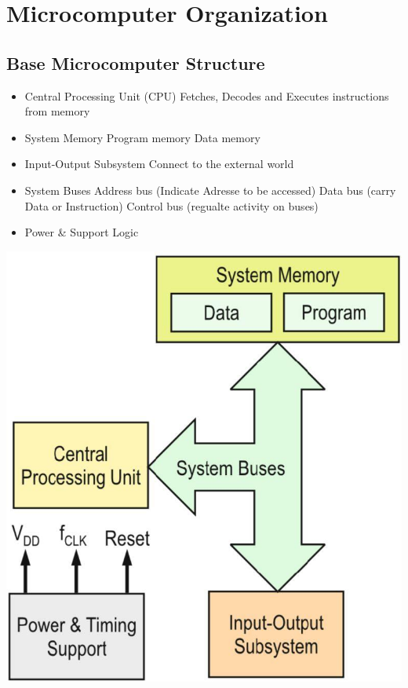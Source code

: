\section{Microcomputer Organization } 
\subsection{Base Microcomputer Structure }
\begin{minipage}{0.7\linewidth}
	\begin{itemize}
		\item Central Processing Unit (\acs{CPU})
		\subitem Fetches, Decodes and Executes instructions from memory
		\item System Memory
		\subitem Program memory
		\subitem Data memory 
		\item Input-Output Subsystem
		\subitem Connect to the external world
		\item System Buses 
		\subitem Address bus (Indicate Adresse to be accessed)
		\subitem Data bus (carry Data or Instruction)
		\subitem Control bus (regualte activity on buses)
		\item Power \& Support Logic
	\end{itemize}
\end{minipage}
\begin{minipage}{0.3\linewidth}
	\includegraphics[width=\linewidth]{images/uCArchitecture} 
\end{minipage}

